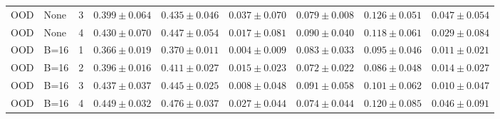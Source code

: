 \begin{table}[H]
\begin{tabular}{@{}llccccccc@{}}
OOD & None & 3 & $0.399\pm0.064$ & $0.435\pm0.046$ & $0.037\pm0.070$ & $0.079\pm0.008$ & $0.126\pm0.051$ & $0.047\pm0.054$\\
OOD & None & 4 & $0.430\pm0.070$ & $0.447\pm0.054$ & $0.017\pm0.081$ & $0.090\pm0.040$ & $0.118\pm0.061$ & $0.029\pm0.084$\\
OOD & B=16 & 1 & $0.366\pm0.019$ & $0.370\pm0.011$ & $0.004\pm0.009$ & $0.083\pm0.033$ & $0.095\pm0.046$ & $0.011\pm0.021$\\
OOD & B=16 & 2 & $0.396\pm0.016$ & $0.411\pm0.027$ & $0.015\pm0.023$ & $0.072\pm0.022$ & $0.086\pm0.048$ & $0.014\pm0.027$\\
OOD & B=16 & 3 & $0.437\pm0.037$ & $0.445\pm0.025$ & $0.008\pm0.048$ & $0.091\pm0.058$ & $0.101\pm0.062$ & $0.010\pm0.047$\\
OOD & B=16 & 4 & $0.449\pm0.032$ & $0.476\pm0.037$ & $0.027\pm0.044$ & $0.074\pm0.044$ & $0.120\pm0.085$ & $0.046\pm0.091$\\
\bottomrule
\end{tabular}
\end{table}
